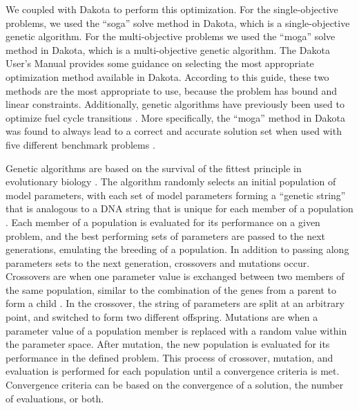 We coupled \Cyclus \cite{huff_fundamental_2016} with Dakota 
\cite{adams_dakota_2021} to perform this optimization. For the 
single-objective problems, we used the ``soga'' solve method in 
Dakota, which is a single-objective genetic algorithm. For the 
multi-objective problems we used the ``moga'' solve method in 
Dakota, which is a multi-objective genetic algorithm. The Dakota 
User's Manual \cite{adams_dakota_2021} provides some guidance 
on selecting the most appropriate optimization method available 
in Dakota. According to this guide, these two methods are the most 
appropriate to use, because the problem has bound and linear constraints. 
Additionally, genetic algorithms
have previously been used to optimize fuel cycle transitions 
\cite{passerini_systematic_2014}. More specifically, the ``moga'' method 
in Dakota was found to always lead to a correct and accurate solution set 
when used with five different benchmark problems \cite{chiandussi_comparison_2012}.


Genetic algorithms are based on the survival of the fittest principle in 
evolutionary biology \cite{adams_dakota_2021}. The algorithm randomly 
selects an initial population of model parameters, with each set of model 
parameters forming a ``genetic string'' that is analogous to a DNA string 
that is unique for each member of a population \cite{adams_dakota_2021}.
Each member of a population is evaluated for its performance on a given 
problem, and the best performing sets of parameters are passed to the next 
generations, emulating the breeding of a population. In addition to 
passing along parameters sets to the next generation, crossovers and 
mutations occur. Crossovers are when one parameter value is exchanged 
between two members of the same population, similar to the combination of 
the genes from a parent to form a child \cite{kramer_genetic_2017}. In 
the crossover, the string of parameters are split at an arbitrary point, and 
switched to form two different offspring.
Mutations are when a parameter 
value of a population member is replaced with a random value within the 
parameter space. After mutation, the new population is evaluated for 
its performance in the defined problem. This process of 
crossover, mutation, and evaluation is performed for each population 
until a convergence criteria is met. Convergence criteria can be based on 
the convergence of a solution, the number of evaluations, or both. 

